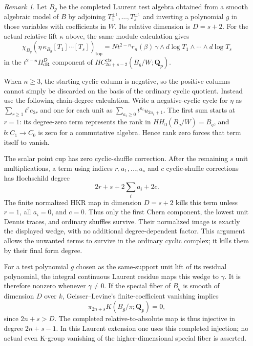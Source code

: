 \documentclass[11pt,a4paper]{amsart}
\numberwithin{equation}{section}
\theoremstyle{definition}
\theoremstyle{remark}
\newtheorem{remark}[theorem]{Remark}
\begin{document}
\begin{remark}
Let $B_g$ be the completed Laurent test algebra obtained from a
smooth algebraic model of $B$ by adjoining
$T_1^{\pm1},\ldots,T_s^{\pm1}$ and inverting a polynomial $g$
in those variables with coefficients in $W$. Its relative
dimension is $D=s+2$. For the actual relative lift $\kappa$ above,
the same module calculation gives
\[
 \chi_{B_g}\!\left(\eta\,\kappa_{B_g}
                         [T_1]\cdots[T_s]\right)_{\mathrm{top}}
   =N t^{2-n}r_n(\beta)\,
           \gamma\wedge d\log T_1\wedge\cdots\wedge d\log T_s
\]
in the $t^{2-n}H^D_{\mathrm{dR}}$ component of
$HC_{2n+s-2}^{\mathrm{cts}}(B_g/W;\mathbf Q_p)$.

When $n\geq3$, the starting cyclic column is negative, so the
positive columns cannot simply be discarded on the basis of the
ordinary cyclic quotient. Instead use the following chain-degree
calculation. Write a negative-cyclic cycle for $\eta$ as
$\sum_{r\geq1}t^r e_{2r}$ and one for each unit as
$\sum_{a_i\geq0}t^{a_i}u_{2a_i+1}$.
The first sum starts at $r=1$: its degree-zero term represents the
rank in $HH_0(B_g/W)=B_g$, and $b:C_1\to C_0$ is zero for a
commutative algebra. Hence rank zero forces that term itself to
vanish.

The scalar point cup has zero cyclic-shuffle correction. After
the remaining $s$ unit multiplications, a term using indices
$r,a_1,\ldots,a_s$ and $c$ cyclic-shuffle corrections has
Hochschild degree
\[
                   2r+s+2\sum_i a_i+2c.
\]
The finite normalized HKR map in dimension $D=s+2$ kills this
term unless $r=1$, all $a_i=0$, and $c=0$. Thus only the first
Chern component, the lowest unit Dennis traces, and ordinary
shuffles survive. Their normalized image is exactly the
displayed wedge, with no additional degree-dependent factor.
This argument allows the unwanted terms to survive in the
ordinary cyclic complex; it kills them by their final form degree.

For a test polynomial $g$ chosen as the same-support unit lift of
its residual polynomial, the integral continuous Laurent residue
maps this wedge to $\gamma$. It is therefore nonzero whenever
$\gamma\ne0$. If the special fiber of $B_g$ is smooth of dimension
$D$ over $k$, Geisser--Levine's finite-coefficient vanishing
\cite[Theorem~8.4]{GeisserLevineCharP} implies
\[
 \pi_{2n+s}K(B_g/\pi;\mathbf Q_p)=0,
\]
since $2n+s>D$. The completed relative-to-absolute map is thus
injective in degree $2n+s-1$. In this Laurent extension one uses
this completed injection; no actual even K-group vanishing of
the higher-dimensional special fiber is asserted.
\end{remark}
\end{document}
